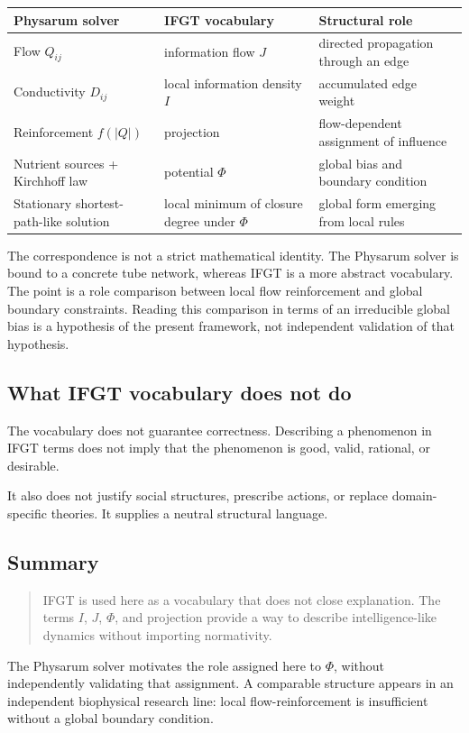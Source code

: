 \begin{table}[H]
\centering
\small
\begin{tabularx}{\textwidth}{>{\raggedright\arraybackslash}X>{\raggedright\arraybackslash}X>{\raggedright\arraybackslash}X}
\toprule
Physarum solver & IFGT vocabulary & Structural role \\
\midrule
Flow \(Q_{ij}\) & information flow \(J\) & directed propagation through an edge \\
Conductivity \(D_{ij}\) & local information density \(I\) & accumulated edge weight \\
Reinforcement \(f(|Q|)\) & projection & flow-dependent assignment of influence \\
Nutrient sources + Kirchhoff law & potential \(\Phi\) & global bias and boundary condition \\
Stationary shortest-path-like solution & local minimum of closure degree under \(\Phi\) & global form emerging from local rules \\
\bottomrule
\end{tabularx}
\end{table}

The correspondence is not a strict mathematical identity. The Physarum solver is bound to a concrete tube network, whereas IFGT is a more abstract vocabulary. The point is a role comparison between local flow reinforcement and global boundary constraints. Reading this comparison in terms of an irreducible global bias is a hypothesis of the present framework, not independent validation of that hypothesis.

\subsection{What IFGT vocabulary does not do}

The vocabulary does not guarantee correctness. Describing a phenomenon in IFGT terms does not imply that the phenomenon is good, valid, rational, or desirable.

It also does not justify social structures, prescribe actions, or replace domain-specific theories. It supplies a neutral structural language.

\subsection{Summary}

\begin{quote}
IFGT is used here as a vocabulary that does not close explanation. The terms \(I\), \(J\), \(\Phi\), and projection provide a way to describe intelligence-like dynamics without importing normativity.
\end{quote}

The Physarum solver motivates the role assigned here to \(\Phi\), without independently validating that assignment. A comparable structure appears in an independent biophysical research line: local flow-reinforcement is insufficient without a global boundary condition.
